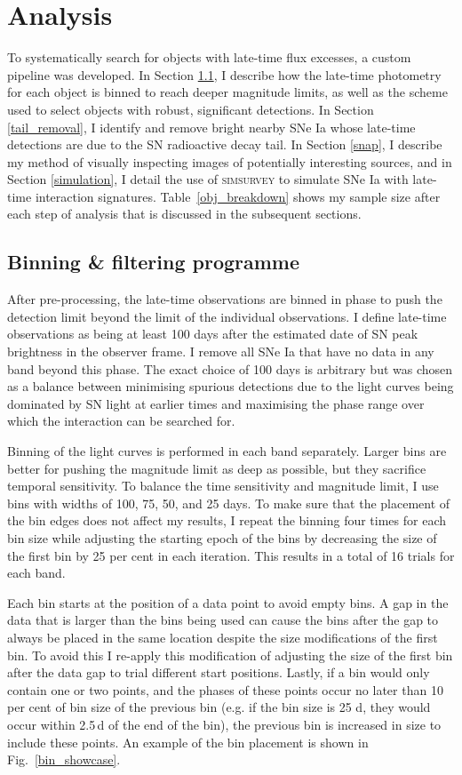 \documentclass[a4paper,oneside,12pt, class=Latex/Classes/PhDthesisPSnPDF, crop=false]{standalone}
\begin{document}
\section{Analysis}
\label{DR2_analysis}
To systematically search for objects with late-time flux excesses, a custom pipeline was developed. In Section \ref{pipeline}, I describe how the late-time photometry for each object is binned to reach deeper magnitude limits, as well as the scheme used to select objects with robust, significant detections. In Section \ref{tail_removal}, I identify and remove bright nearby SNe Ia whose late-time detections are due to the SN radioactive decay tail. In Section \ref{snap}, I describe my method of visually inspecting images of potentially interesting sources, and in Section \ref{simulation}, I detail the use of \textsc{simsurvey} to simulate SNe Ia with late-time interaction signatures. Table~\ref{obj_breakdown} shows my sample size after each step of analysis that is discussed in the subsequent sections. 


\subsection{Binning \& filtering programme}
\label{pipeline}
After pre-processing, the late-time observations are binned in phase to push the detection limit beyond the limit of the individual observations. I define late-time observations as being at least 100 days after the estimated date of SN peak brightness in the observer frame. I remove all SNe Ia that have no data in any band beyond this phase. The exact choice of 100 days is arbitrary but was chosen as a balance between minimising spurious detections due to the light curves being dominated by SN light at earlier times and maximising the phase range over which the interaction can be searched for. 

Binning of the light curves is performed in each band separately. Larger bins are better for pushing the magnitude limit as deep as possible, but they sacrifice temporal sensitivity. To balance the time sensitivity and magnitude limit, I use bins with widths of 100, 75, 50, and 25 days. To make sure that the placement of the bin edges does not affect my results, I repeat the binning four times for each bin size while adjusting the starting epoch of the bins by decreasing the size of the first bin by 25 per cent in each iteration. This results in a total of 16 trials for each band.

Each bin starts at the position of a data point to avoid empty bins. A gap in the data that is larger than the bins being used can cause the bins after the gap to always be placed in the same location despite the size modifications of the first bin. To avoid this I re-apply this modification of adjusting the size of the first bin after the data gap to trial different start positions. Lastly, if a bin would only contain one or two points, and the phases of these points occur no later than 10 per cent of bin size of the previous bin (e.g. if the bin size is 25 d, they would occur within 2.5\,d of the end of the bin), the previous bin is increased in size to include these points. An example of the bin placement is shown in Fig.~\ref{bin_showcase}.
\end{document}
